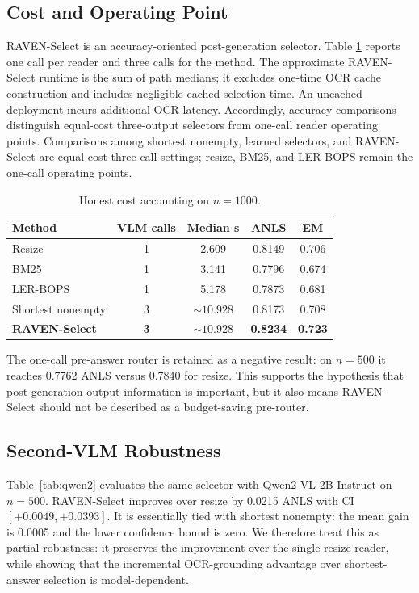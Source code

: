 \documentclass[journal]{IEEEtran}
\begin{document}
\subsection{Cost and Operating Point}
RAVEN-Select is an accuracy-oriented post-generation selector.  Table
\ref{tab:cost} reports one call per reader and three calls for the method.
The approximate RAVEN-Select runtime is the sum of path medians; it excludes
one-time OCR cache construction and includes negligible cached selection time.
An uncached deployment incurs additional OCR latency.
Accordingly, accuracy comparisons distinguish equal-cost three-output
selectors from one-call reader operating points.
Comparisons among shortest nonempty, learned selectors, and RAVEN-Select are
equal-cost three-call settings; resize, BM25, and LER-BOPS remain the one-call
operating points.

\begin{table}[t]
\centering
\caption{Honest cost accounting on $n=1000$.}
\label{tab:cost}
\begin{tabular}{lcccc}
\toprule
Method & VLM calls & Median s & ANLS & EM\\
\midrule
Resize & 1 & 2.609 & 0.8149 & 0.706\\
BM25 & 1 & 3.141 & 0.7796 & 0.674\\
LER-BOPS & 1 & 5.178 & 0.7873 & 0.681\\
Shortest nonempty & 3 & $\sim10.928$ & 0.8173 & 0.708\\
\textbf{RAVEN-Select} & \textbf{3} & $\mathbf{\sim10.928}$ & \textbf{0.8234} & \textbf{0.723}\\
\bottomrule
\end{tabular}
\end{table}

The one-call pre-answer router is retained as a negative result: on $n=500$ it
reaches 0.7762 ANLS versus 0.7840 for resize.  This supports the hypothesis that
post-generation output information is important, but it also means
RAVEN-Select should not be described as a budget-saving pre-router.

\subsection{Second-VLM Robustness}
Table~\ref{tab:qwen2} evaluates the same selector with Qwen2-VL-2B-Instruct on
$n=500$.  RAVEN-Select improves over resize by 0.0215 ANLS with CI
$[+0.0049,+0.0393]$.  It is essentially tied with shortest nonempty: the mean
gain is 0.0005 and the lower confidence bound is zero.  We therefore treat this
as partial robustness: it preserves the improvement over the single resize
reader, while showing that the incremental OCR-grounding advantage over
shortest-answer selection is model-dependent.
\end{document}
